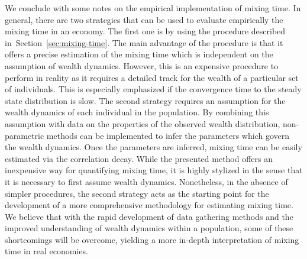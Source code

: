 \documentclass[11pt]{article}
\newcommand{\Sref}[1]{Section~\ref{sec:#1}}
\numberwithin{equation}{section}
\begin{document}
We conclude with some notes on the empirical implementation of mixing time. In general, there are two strategies that can be used to evaluate empirically the mixing time in an economy. The first one is by using the procedure described in~\Sref{mixing-time}. The main advantage of the procedure is that it offers a precise estimation of the mixing time which is independent on the assumption of wealth dynamics. However, this is an expensive procedure to perform in reality as it requires a detailed track for the wealth of a particular set of individuals. This is especially emphasized if the convergence time to the steady state distribution is slow. The second strategy requires an assumption for the wealth dynamics of each individual in the population. By combining this assumption with data on the properties of the observed wealth distribution, non-parametric methods can be implemented to infer the parameters which govern the wealth dynamics. Once the parameters are inferred, mixing time can be easily estimated via the correlation decay.  While the presented method offers an inexpensive way for quantifying mixing time, it is highly stylized in the sense that it is necessary to first assume wealth dynamics. Nonetheless, in the absence of simpler procedures, the second strategy acts as the starting point for the development of a more comprehensive methodology for estimating mixing time. We believe that with the rapid development of data gathering methods and the improved understanding of wealth dynamics within a population, some of these shortcomings will be overcome, yielding a more in-depth interpretation of mixing time in real economies.
\end{document}
